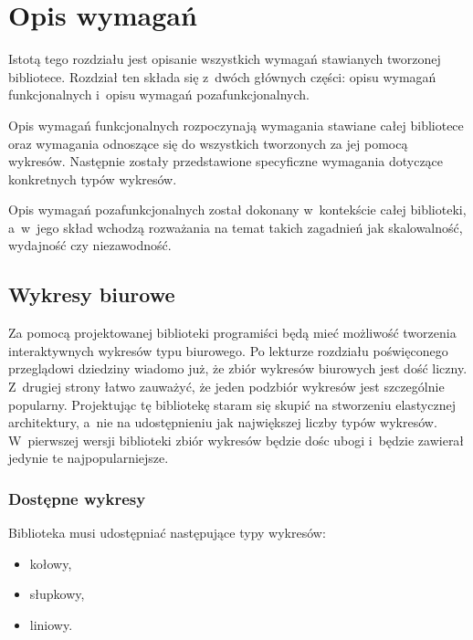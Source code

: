 \chapter{Opis wymagań}
Istotą tego rozdziału jest opisanie wszystkich wymagań stawianych tworzonej bibliotece. 
Rozdział ten składa się z~dwóch głównych części: opisu wymagań funkcjonalnych i~opisu wymagań pozafunkcjonalnych.

Opis wymagań funkcjonalnych rozpoczynają wymagania stawiane całej bibliotece oraz wymagania odnoszące się do wszystkich tworzonych za jej pomocą wykresów. Następnie zostały przedstawione specyficzne wymagania dotyczące konkretnych typów wykresów.

Opis wymagań pozafunkcjonalnych został dokonany w~kontekście całej biblioteki, a~w~jego skład wchodzą rozważania na temat takich zagadnień jak skalowalność, wydajność czy niezawodność.


\section{Wykresy biurowe}
Za pomocą projektowanej biblioteki programiści będą mieć możliwość tworzenia interaktywnych wykresów typu biurowego. Po lekturze rozdziału poświęconego przeglądowi dziedziny wiadomo już, że zbiór wykresów biurowych jest dość liczny. Z~drugiej strony łatwo zauważyć, że jeden podzbiór wykresów jest szczególnie popularny. Projektując tę bibliotekę staram się skupić na stworzeniu elastycznej architektury, a~nie na udostępnieniu jak największej liczby typów wykresów. W~pierwszej wersji biblioteki zbiór wykresów będzie dośc ubogi i~będzie zawierał jedynie te najpopularniejsze.

\subsection{Dostępne wykresy}
Biblioteka musi udostępniać następujące typy wykresów:
\begin{itemize}
\item{kołowy,}
\item{słupkowy,}
\item{liniowy.}
\end{itemize}



